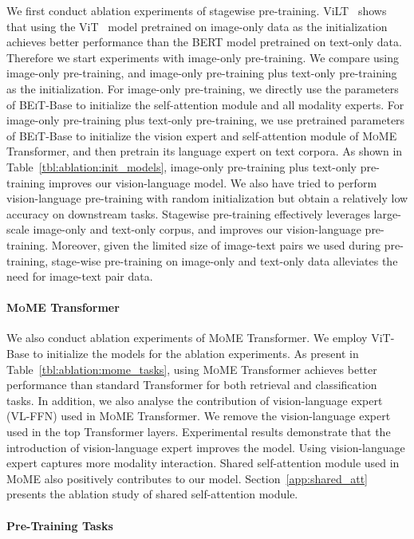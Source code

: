 \documentclass{article}
\newcommand\mome{\textsc{MoME}}
\newcommand\beit{\textsc{BEiT}}
\begin{document}
We first conduct ablation experiments of stagewise pre-training.
ViLT~\citep{vilt} shows that using the ViT~\citep{vit} model pretrained on image-only data as the initialization achieves better performance than the BERT model pretrained on text-only data.
Therefore we start experiments with image-only pre-training. 
We compare using image-only pre-training, and image-only pre-training plus text-only pre-training as the initialization.
For image-only pre-training, we directly use the parameters of \beit{}-Base to initialize the self-attention module and all modality experts.
For image-only pre-training plus text-only pre-training, we use pretrained parameters of \beit{}-Base to initialize the vision expert and self-attention module of \mome{} Transformer, and then pretrain its language expert on text corpora.
As shown in Table~\ref{tbl:ablation:init_models}, image-only pre-training plus text-only pre-training improves our vision-language model.
We also have tried to perform vision-language pre-training with random initialization but obtain a relatively low accuracy on downstream tasks.
Stagewise pre-training effectively leverages large-scale image-only and text-only corpus, and improves our vision-language pre-training.
Moreover, given the limited size of image-text pairs we used during pre-training, stage-wise pre-training on image-only and text-only data alleviates the need for image-text pair data.

\paragraph{\mome{} Transformer}

We also conduct ablation experiments of \mome{} Transformer.
We employ ViT-Base to initialize the models for the ablation experiments.
As present in Table~\ref{tbl:ablation:mome_tasks}, using \mome{} Transformer achieves better performance than standard Transformer for both retrieval and classification tasks.
In addition, we also analyse the contribution of vision-language expert (VL-FFN) used in \mome{} Transformer.
We remove the vision-language expert used in the top Transformer layers. 
Experimental results demonstrate that the introduction of vision-language expert improves the model.
Using vision-language expert captures more modality interaction.
Shared self-attention module used in \mome{} also positively contributes to our model.
Section~\ref{app:shared_att} presents the ablation study of shared self-attention module.

\paragraph{Pre-Training Tasks}
\end{document}
